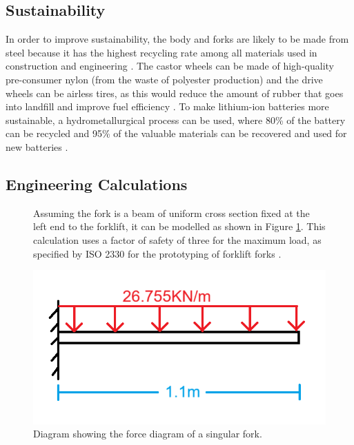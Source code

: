 \documentclass[12pt,titlepage]{article}
\begin{document}
\subsection{Sustainability}
In order to improve sustainability, the body and forks are likely to be made from steel because it has the highest recycling rate among all materials used in construction and engineering \cite{baker2023}. The castor wheels can be made of high-quality pre-consumer nylon (from the waste of polyester production) \cite{eco2022} and the drive wheels can be airless tires, as this would reduce the amount of rubber that goes into landfill and improve fuel efficiency \cite{ImperialTyres}. To make lithium-ion batteries more sustainable, a hydrometallurgical process can be used, where 80\% of the battery can be recycled and 95\% of the valuable materials can be recovered and used for new batteries \cite{Lithium-ion}.

\subsection {Engineering Calculations}
\vspace{-8pt}
\begin{figure}[H]
    \centering
    \begin{minipage}[t]{0.5\textwidth}
        \vspace{0pt}
        \linespread{1.5}
        Assuming the fork is a beam of uniform cross section fixed at the left end to the forklift, it can be modelled as shown in Figure \ref{fig:x}. This calculation uses a factor of safety of three for the maximum load, as specified by ISO 2330 for the prototyping of forklift forks \cite{iso2330}.
    \end{minipage}%
    \hfill
    \begin{minipage}[t]{0.45\textwidth}
        \vspace{-32pt} 
        \centering
        \includegraphics[width=\linewidth]{fork as a beam diagram.png}
        \vspace{-40pt}
        \caption{Diagram showing the force diagram of a singular fork.}
        \label{fig:x}
    \end{minipage}
\end{figure}
\end{document}
